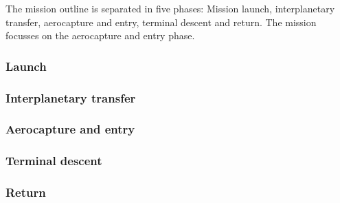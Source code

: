 The mission outline is separated in five phases: Mission launch, interplanetary transfer, aerocapture and entry, terminal descent and return. The mission focusses on the aerocapture and entry phase. %

\subsubsection{Launch} \label{sec:launch}


\subsubsection{Interplanetary transfer} \label{sec:interplanetary}


\subsubsection{Aerocapture and entry} \label{sec:entry}


\subsubsection{Terminal descent} \label{sec:terminal}


%

\subsubsection{Return} \label{sec:return}







